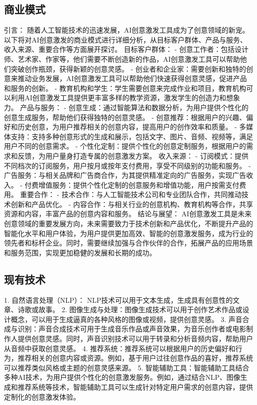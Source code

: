 \subsection{商业模式}
引言：
随着人工智能技术的迅速发展，AI创意激发工具成为了创意领域的新宠。以下将对AI创意激发的商业模式进行详细分析，从目标客户群体、产品与服务、收入来源、重要合作等方面展开探讨。
目标客户群体：
- 创意工作者：包括设计师、艺术家、作家等，他们需要不断创造新的作品，AI创意激发工具可以帮助他们突破创作瓶颈，获得新颖的创意灵感。
- 创业者和企业家：需要创新和独特的创意来推动业务发展，AI创意激发工具可以帮助他们快速获得创意灵感，促进产品和服务的创新。
- 教育机构和学生：学生需要创意来完成作业和项目，教育机构可以利用AI创意激发工具提供更丰富多样的教学资源，激发学生的创造力和想象力。
产品与服务：
- 创意生成：通过智能算法和数据分析，为用户提供个性化的创意生成服务，帮助他们获得独特的创意灵感。
- 创意推荐：根据用户的兴趣、偏好和历史创意，为用户推荐相关的创意内容，提高用户的创作效率和质量。
- 多媒体支持：支持多种创意形式的生成和展示，包括文字、图片、音频、视频等，满足用户不同的创意需求。
- 个性化定制：提供个性化的创意定制服务，根据用户的需求和反馈，为用户量身打造专属的创意激发方案。
收入来源：
- 订阅模式：提供不同档次的订阅服务，用户按月或按年支付费用，享受不同级别的功能和服务。
- 广告服务：与相关品牌和广告商合作，为其提供精准定向的广告服务，实现广告收入。
- 付费增值服务：提供个性化定制的创意服务和增值功能，用户按需支付费用。
重要合作：
- 技术合作：与人工智能技术公司和专业团队合作，共同推动技术创新和产品优化。
- 内容合作：与相关行业的创意机构、教育机构等合作，共享资源和内容，丰富产品的创意内容和服务。
结论与展望：
AI创意激发工具是未来创意领域的重要发展方向，未来需要致力于技术创新和产品优化，不断提升产品的智能化水平和用户体验，为用户提供更加高效、智能的创意激发服务，成为行业的领先者和标杆企业。同时，需要继续加强与合作伙伴的合作，拓展产品的应用场景和服务范围，实现更加稳健的发展和长期的成功。
\subsection{现有技术}
1. 自然语言处理（NLP）： NLP技术可以用于文本生成，生成具有创意性的文章、诗歌或故事。
2. 图像生成与处理：图像生成技术可以用于创作艺术作品或设计概念，可以用于生成逼真的各种风格的图像或视频，提供创意灵感。
3. 声音合成与识别：声音合成技术可用于生成音乐作品或声音效果，为音乐创作者或电影制作人提供创意灵感。同时，声音识别技术可以用于转录和分析音频内容，帮助用户从音频中获取创意灵感。
4. 推荐系统：推荐系统可以根据用户的历史偏好和行为，推荐相关的创意内容或资源。例如，基于用户过往创意作品的喜好，推荐系统可以推荐类似风格或主题的创意灵感来源。
5. 智能辅助工具：智能辅助工具结合多种AI技术，为用户提供个性化的创意激发服务。例如，通过结合NLP、图像生成和推荐系统等技术，智能辅助工具可以生成针对特定用户需求的创意内容，提供定制化的创意激发体验。
